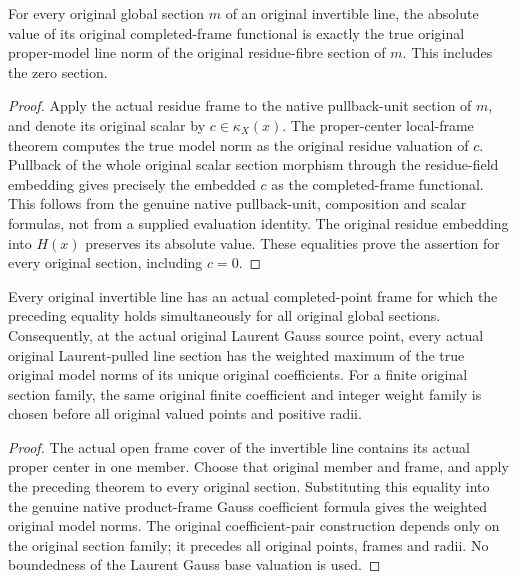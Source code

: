 \begin{theorem}\label{thm:fc-point-completed-frame-model-norm}
\leanok
{}
For every original global section $m$ of an original invertible line,
the absolute value of its original completed-frame functional is
exactly the true original proper-model line norm of the original
residue-fibre section of $m$. This includes the zero section.
\end{theorem}
\begin{proof}
Apply the actual residue frame to the native pullback-unit section
of $m$, and denote its original scalar by $c\in\kappa_X(x)$.
The proper-center local-frame theorem computes the true model
norm as the original residue valuation of $c$. Pullback of the
whole original scalar section morphism through the residue-field
embedding gives precisely the embedded $c$ as the completed-frame
functional. This follows from the genuine native pullback-unit,
composition and scalar formulas, not from a supplied evaluation
identity. The original residue embedding into $H(x)$ preserves its
absolute value. These equalities prove the assertion for every
original section, including $c=0$.
\end{proof}

\begin{corollary}\label{cor:fc-point-exists-completed-frame-model-norm}
\leanok
{}
Every original invertible line has an actual completed-point frame
for which the preceding equality holds simultaneously for all
original global sections. Consequently, at the actual original
Laurent Gauss source point, every actual original Laurent-pulled
line section has the weighted maximum of the true original model
norms of its unique original coefficients. For a finite original
section family, the same original finite coefficient and integer
weight family is chosen before all original valued points and
positive radii.
\end{corollary}
\begin{proof}
The actual open frame cover of the invertible line contains its
actual proper center in one member. Choose that original member
and frame, and apply the preceding theorem to every original
section. Substituting this equality into the genuine native
product-frame Gauss coefficient formula gives the weighted
original model norms. The original coefficient-pair construction
depends only on the original section family; it precedes all
original points, frames and radii. No boundedness of the Laurent
Gauss base valuation is used.
\end{proof}
